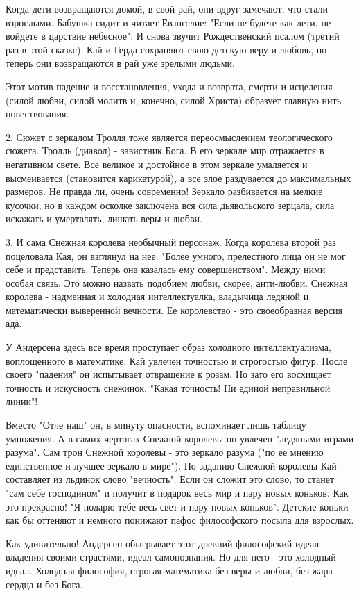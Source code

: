 Когда дети возвращаются домой, в свой рай, они вдруг замечают, что стали
взрослыми. Бабушка сидит и читает Евангелие: "Если не будете как дети, не
войдете в царствие небесное". И снова звучит Рождественский псалом (третий раз
в этой сказке). Кай и Герда сохраняют свою детскую веру и любовь, но теперь они
возвращаются в рай уже зрелыми людьми. 

Этот мотив падение и восстановления, ухода и возврата, смерти и исцеления
(силой любви, силой молитв и, конечно, силой Христа) образует главную нить
повествования. 

2. Сюжет с зеркалом Тролля тоже является переосмыслением теологического сюжета.
Тролль (диавол) - завистник Бога. В его зеркале мир отражается в негативном
свете. Все великое и достойное в этом зеркале умаляется и высмеивается
(становится карикатурой), а все злое раздувается до максимальных размеров. Не
правда ли, очень современно! Зеркало разбивается на мелкие кусочки, но в каждом
осколке заключена вся сила дьявольского зерцала, сила искажать и умертвлять,
лишать веры и любви. 

3. И сама Снежная королева необычный персонаж. Когда королева второй раз
поцеловала Кая, он взглянул на нее: "Более умного, прелестного лица он не мог
себе и представить. Теперь она казалась ему совершенством". Между ними особая
связь. Это можно назвать подобием любви, скорее, анти-любви. Снежная королева -
надменная и холодная интеллектуалка, владычица ледяной и математически
выверенной вечности. Ее королевство - это своеобразная версия ада. 

У Андерсена здесь все время проступает образ холодного интеллектуализма,
воплощенного в математике. Кай увлечен точностью и строгостью фигур. После
своего "падения" он испытывает отвращение к розам. Но зато его восхищает
точность и искусность снежинок. "Какая точность! Ни единой неправильной линии"! 

Вместо "Отче наш" он, в минуту опасности, вспоминает лишь таблицу умножения. А
в самих чертогах Снежной королевы он увлечен "ледяными играми разума". Сам трон
Снежной королевы - это зеркало разума ("по ее мнению единственное и лучшее
зеркало в мире"). По заданию Снежной королевы Кай составляет из льдинок слово
"вечность". Если он сложит это слово, то станет "сам себе господином" и получит
в подарок весь мир и пару новых коньков. Как это прекрасно! "Я подарю тебе весь
свет и пару новых коньков". Детские коньки как бы оттеняют и немного понижают
пафос философского посыла для взрослых. 

Как удивительно! Андерсен обыгрывает этот древний философский идеал владения
своими страстями, идеал самопознания. Но для него - это холодный идеал.
Холодная философия, строгая математика без веры и любви, без жара сердца и без
Бога. 

